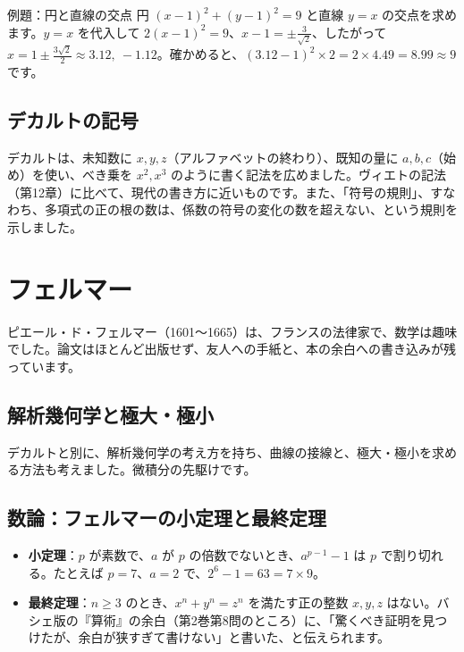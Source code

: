 \documentclass[a4paper,11pt,openany]{ltjsbook}
\begin{document}
\begin{examplebox}{例題：円と直線の交点}
円 $(x-1)^2+(y-1)^2=9$ と直線 $y=x$ の交点を求めます。$y=x$ を代入して $2(x-1)^2=9$、$x-1=\pm\tfrac{3}{\sqrt2}$、したがって $x=1\pm\tfrac{3\sqrt2}{2}\approx3.12,\ -1.12$。確かめると、$(3.12-1)^2\times2=2\times4.49=8.99\approx9$ です。
\end{examplebox}

\subsection{デカルトの記号}

デカルトは、未知数に $x,y,z$（アルファベットの終わり）、既知の量に $a,b,c$（始め）を使い、べき乗を $x^2,x^3$ のように書く記法を広めました。ヴィエトの記法（第12章）に比べて、現代の書き方に近いものです。また、「符号の規則」、すなわち、多項式の正の根の数は、係数の符号の変化の数を超えない、という規則を示しました。

\section{フェルマー}

ピエール・ド・フェルマー（1601〜1665）は、フランスの法律家で、数学は趣味でした。論文はほとんど出版せず、友人への手紙と、本の余白への書き込みが残っています。

\subsection{解析幾何学と極大・極小}

デカルトと別に、解析幾何学の考え方を持ち、曲線の接線と、極大・極小を求める方法も考えました。微積分の先駆けです。

\subsection{数論：フェルマーの小定理と最終定理}

\begin{itemize}[leftmargin=*]
\item \textbf{小定理}：$p$ が素数で、$a$ が $p$ の倍数でないとき、$a^{p-1}-1$ は $p$ で割り切れる。たとえば $p=7$、$a=2$ で、$2^6-1=63=7\times9$。
\item \textbf{最終定理}：$n\ge3$ のとき、$x^n+y^n=z^n$ を満たす正の整数 $x,y,z$ はない。バシェ版の『算術』の余白（第2巻第8問のところ）に、「驚くべき証明を見つけたが、余白が狭すぎて書けない」と書いた、と伝えられます。
\end{itemize}
\end{document}
